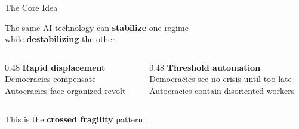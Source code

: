 \documentclass[
  ignorenonframetext,
  aspectratio=169]{beamer}
\begin{document}
\begin{frame}{The Core Idea}
\protect{}\label{the-core-idea}
\begin{center}
\Large The same AI technology can \textcolor{myTeal}{\textbf{stabilize}} one regime\\
while \textcolor{myRed}{\textbf{destabilizing}} the other.
\end{center}

\vspace{0.5cm}

\begin{columns}[T]
\begin{column}{0.48\textwidth}
\centering\textbf{Rapid displacement}\\[4pt]
\textcolor{myTeal}{Democracies compensate}\\
\textcolor{myRed}{Autocracies face organized revolt}
\end{column}
\begin{column}{0.48\textwidth}
\centering\textbf{Threshold automation}\\[4pt]
\textcolor{myRed}{Democracies see no crisis until too late}\\
\textcolor{myTeal}{Autocracies contain disoriented workers}
\end{column}
\end{columns}

\vspace{0.4cm}

\begin{center}
\small This is the \textbf{crossed fragility} pattern.
\end{center}
\end{frame}
\end{document}
